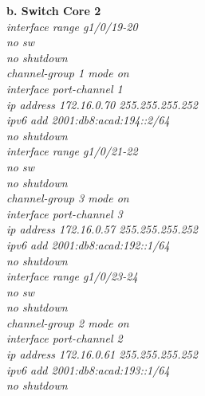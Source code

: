 \documentclass[12pt,a4paper]{report}
\begin{document}
\hspace*{1cm}\textbf{b. Switch Core 2}\\
\hspace*{2cm}\textit{interface range g1/0/19-20\\
\hspace*{2cm}no sw\\
\hspace*{2cm}no shutdown\\
\hspace*{2cm}channel-group 1 mode on \\
\hspace*{2cm}interface port-channel 1\\
\hspace*{2cm}ip address 172.16.0.70 255.255.255.252\\
\hspace*{2cm}ipv6 add 2001:db8:acad:194::2/64\\
\hspace*{2cm}no shutdown\\
\hspace*{2cm}interface range g1/0/21-22\\
\hspace*{2cm}no sw\\
\hspace*{2cm}no shutdown\\
\hspace*{2cm}channel-group 3 mode on \\
\hspace*{2cm}interface port-channel 3\\
\hspace*{2cm}ip address 172.16.0.57 255.255.255.252\\
\hspace*{2cm}ipv6 add 2001:db8:acad:192::1/64\\
\hspace*{2cm}no shutdown\\
\hspace*{2cm}interface range g1/0/23-24\\
\hspace*{2cm}no sw\\
\hspace*{2cm}no shutdown\\
\hspace*{2cm}channel-group 2 mode on \\
\hspace*{2cm}interface port-channel 2\\
\hspace*{2cm}ip address 172.16.0.61 255.255.255.252\\
\hspace*{2cm}ipv6 add 2001:db8:acad:193::1/64\\
\hspace*{2cm}no shutdown\\}
\end{document}
